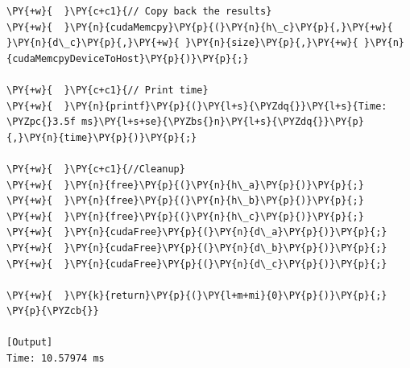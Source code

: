 \begin{Verbatim}[label=\makebox{\url{https://github.com/lucabaldini/cmepda/tree/master/slides/latex/snippets/cuda_vec_add_gpu.cu}},commandchars=\\\{\}]
\PY{+w}{  }\PY{c+c1}{// Copy back the results}
\PY{+w}{  }\PY{n}{cudaMemcpy}\PY{p}{(}\PY{n}{h\_c}\PY{p}{,}\PY{+w}{ }\PY{n}{d\_c}\PY{p}{,}\PY{+w}{ }\PY{n}{size}\PY{p}{,}\PY{+w}{ }\PY{n}{cudaMemcpyDeviceToHost}\PY{p}{)}\PY{p}{;}

\PY{+w}{  }\PY{c+c1}{// Print time}
\PY{+w}{  }\PY{n}{printf}\PY{p}{(}\PY{l+s}{\PYZdq{}}\PY{l+s}{Time: \PYZpc{}3.5f ms}\PY{l+s+se}{\PYZbs{}n}\PY{l+s}{\PYZdq{}}\PY{p}{,}\PY{n}{time}\PY{p}{)}\PY{p}{;}

\PY{+w}{  }\PY{c+c1}{//Cleanup}
\PY{+w}{  }\PY{n}{free}\PY{p}{(}\PY{n}{h\_a}\PY{p}{)}\PY{p}{;}
\PY{+w}{  }\PY{n}{free}\PY{p}{(}\PY{n}{h\_b}\PY{p}{)}\PY{p}{;}
\PY{+w}{  }\PY{n}{free}\PY{p}{(}\PY{n}{h\_c}\PY{p}{)}\PY{p}{;}
\PY{+w}{  }\PY{n}{cudaFree}\PY{p}{(}\PY{n}{d\_a}\PY{p}{)}\PY{p}{;}
\PY{+w}{  }\PY{n}{cudaFree}\PY{p}{(}\PY{n}{d\_b}\PY{p}{)}\PY{p}{;}
\PY{+w}{  }\PY{n}{cudaFree}\PY{p}{(}\PY{n}{d\_c}\PY{p}{)}\PY{p}{;}

\PY{+w}{  }\PY{k}{return}\PY{p}{(}\PY{l+m+mi}{0}\PY{p}{)}\PY{p}{;}
\PY{p}{\PYZcb{}}

[Output]
Time: 10.57974 ms
\end{Verbatim}